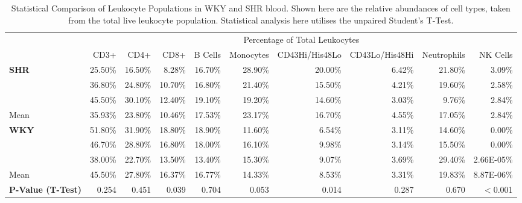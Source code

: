 \begin{sidewaystable}[!htbp]
\scriptsize
\centering
\begin{tabular}{lrrrrrrrrr}
               & \multicolumn{9}{c}{Percentage of Total Leukocytes}                                                           \\
                          & CD3+    & CD4+    & CD8+    & B Cells & Monocytes & CD43Hi/His48Lo & CD43Lo/His48Hi & Neutrophils & NK Cells \\
               \hline
\textbf{SHR}              & 25.50\% & 16.50\% & 8.28\%  & 16.70\% & 28.90\%   & 20.00\%        & 6.42\%         & 21.80\%     & 3.09\%   \\
                          & 36.80\% & 24.80\% & 10.70\% & 16.80\% & 21.40\%   & 15.50\%        & 4.21\%         & 19.60\%     & 2.58\%   \\
                          & 45.50\% & 30.10\% & 12.40\% & 19.10\% & 19.20\%   & 14.60\%        & 3.03\%         & 9.76\%      & 2.84\%   \\
Mean                      & 35.93\% & 23.80\% & 10.46\% & 17.53\% & 23.17\%   & 16.70\%        & 4.55\%         & 17.05\%     & 2.84\%   \\
\textbf{WKY}              & 51.80\% & 31.90\% & 18.80\% & 18.90\% & 11.60\%   & 6.54\%         & 3.11\%         & 14.60\%     & 0.00\%   \\
                          & 46.70\% & 28.80\% & 16.80\% & 18.00\% & 16.10\%   & 9.98\%         & 3.14\%         & 15.50\%     & 0.00\%   \\
                          & 38.00\% & 22.70\% & 13.50\% & 13.40\% & 15.30\%   & 9.07\%         & 3.69\%         & 29.40\%     & 2.66E-05\% \\
Mean                      & 45.50\% & 27.80\% & 16.37\% & 16.77\% & 14.33\%   & 8.53\%         & 3.31\%         & 19.83\%     & 8.87E-06\% \\
\textbf{P-Value (T-Test)} & 0.254   & 0.451   & 0.039   & 0.704   & 0.053     & 0.014          & 0.287          & 0.670       & $<$0.001   
\end{tabular}
\caption[Statistical Comparison of Leukocyte Populations in WKY and SHR blood]{Statistical Comparison of Leukocyte Populations in WKY and SHR blood. Shown here are the relative abundances of cell types, taken from the total live leukocyte population. Statistical analysis here utilises the unpaired Student's T-Test.}
\label{fig:FACS_LeukPop_stats}
\end{sidewaystable}



